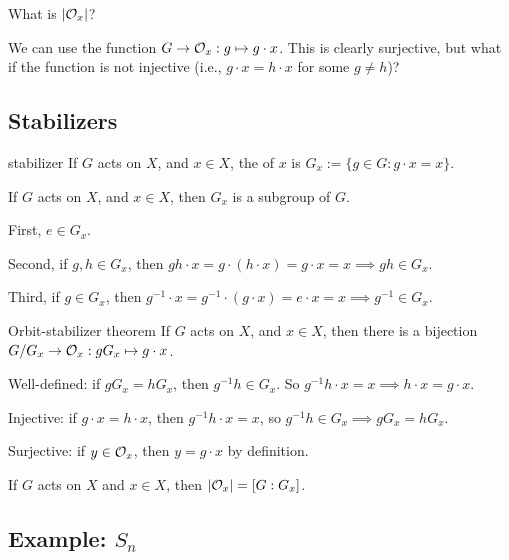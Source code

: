 \documentclass[12pt,letterpaper]{report}
\begin{document}
What is $\lvert\mathcal{O}_x\rvert$?

We can use the function $G \to \mathcal{O}_x : g \mapsto g \cdot x$.
This is clearly surjective, but what if the function is not injective (i.e., $g \cdot x = h \cdot x$
for some $g \neq h$)?

\pagebreak
\subsection{Stabilizers}

\begin{defn}{stabilizer}{}
  If $G$ acts on $X$, and $x \in X$, the  of $x$ is
  $G_x := \{g \in G : g \cdot x = x\}$.
\end{defn}

\begin{prop}{}{}
  If $G$ acts on $X$, and $x \in X$, then $G_x$ is a subgroup of $G$.
\end{prop}

\begin{thmproof}
  First, $e \in G_x$.

  Second, if $g, h \in G_x$, then
  $gh \cdot x = g \cdot (h \cdot x) = g \cdot x = x \implies gh \in G_x$.

  Third, if $g \in G_x$, then
  $g^{-1} \cdot x = g^{-1} \cdot (g \cdot x) = e \cdot x = x \implies g^{-1} \in G_x$.
\end{thmproof}

\begin{thm}{Orbit-stabilizer theorem}{}
  If $G$ acts on $X$, and $x \in X$, then there is a bijection
  $G/G_x \to \mathcal{O}_x : gG_x \mapsto g \cdot x$.
\end{thm}

\begin{thmproof}
  Well-defined: if $gG_x = hG_x$, then $g^{-1}h \in G_x$.
  So $g^{-1}h \cdot x = x \implies h \cdot x = g \cdot x$.

  Injective: if $g \cdot x = h \cdot x$, then $g^{-1}h \cdot x = x$, so
  $g^{-1}h \in G_x \implies gG_x = hG_x$.

  Surjective: if $y \in \mathcal{O}_x$, then $y = g \cdot x$ by definition.
\end{thmproof}

\begin{cor}{}{}
  If $G$ acts on $X$ and $x \in X$, then $\lvert\mathcal{O}_x\rvert = [G : G_x]$.
\end{cor}

\pagebreak
\subsection[Example: Sn]{Example: $S_n$}
\end{document}
